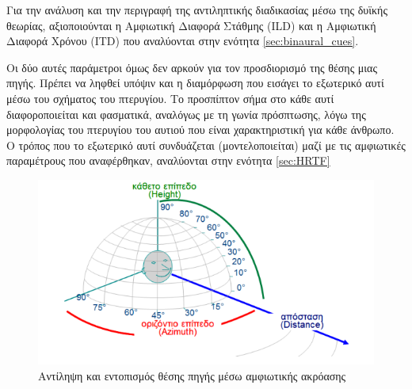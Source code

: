 Για την ανάλυση και την περιγραφή της αντιληπτικής διαδικασίας μέσω της δυϊκής θεωρίας, αξιοποιούνται η Αμφιωτική Διαφορά Στάθμης (ILD) και η Αμφιωτική Διαφορά Χρόνου (ITD) που αναλύονται στην ενότητα \ref{sec:binaural_cues}.

Οι δύο αυτές παράμετροι όμως δεν αρκούν για τον προσδιορισμό της θέσης μιας πηγής. Πρέπει να ληφθεί υπόψιν και η διαμόρφωση που εισάγει το εξωτερικό αυτί μέσω του σχήματος του πτερυγίου. Το προσπίπτον σήμα στο κάθε αυτί διαφοροποιείται και φασματικά, αναλόγως με τη γωνία πρόσπτωσης, λόγω της μορφολογίας του πτερυγίου του αυτιού που είναι χαρακτηριστική για κάθε άνθρωπο. Ο τρόπος που το εξωτερικό αυτί συνδυάζεται (μοντελοποιείται) μαζί με τις αμφιωτικές παραμέτρους που αναφέρθηκαν, αναλύονται στην ενότητα \ref{sec:HRTF}


\begin{figure}[h]
  \centering
  \includegraphics[width=\textwidth]{images/binaural_perception_acoustic_source.png}
  \caption{Αντίληψη και εντοπισμός θέσης πηγής μέσω αμφιωτικής ακρόασης}
  \label{fig:binaural_perception_acoustic_source}
\end{figure}